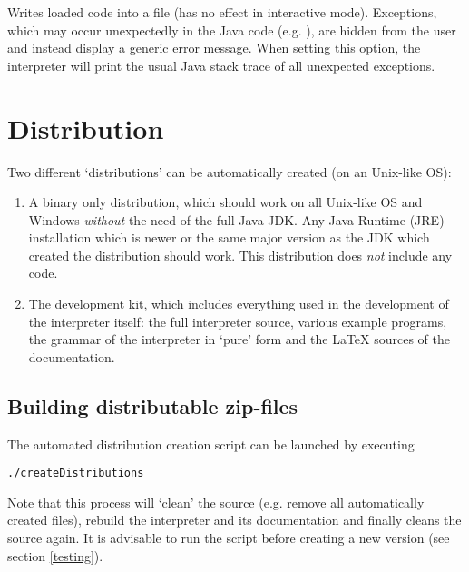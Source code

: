 \begin{itemize}
	      {Writes loaded code into a file (has no effect in interactive mode).}
	      {Exceptions, which may occur unexpectedly in the Java code (e.g. ), are hidden from the user and instead display a generic error message.
		When setting this option, the interpreter will print the usual Java stack trace of all unexpected exceptions.}
\end{itemize}

\section{Distribution}

Two different `distributions' can be automatically created (on an Unix-like OS):

\begin{enumerate}
	\item A binary only distribution, which should work on all Unix-like OS and Windows \emph{without} the need of the full Java JDK.
		Any Java Runtime (JRE) installation which is newer or the same major version as the JDK which created the distribution should work.
		This distribution does \emph{not} include any \SetlX{} code.

	\item The development kit, which includes everything used in the development of the interpreter itself: the full interpreter source, various \SetlX{} example programs, the grammar of the interpreter in `pure' form and the \LaTeX{} sources of the documentation.
\end{enumerate}

\subsection{Building distributable zip-files}

The automated distribution creation script can be launched by executing

\begin{lstlisting}[frame=none,numbers=none]
./createDistributions
\end{lstlisting}

Note that this process will `clean' the source (e.g. remove all automatically created files), rebuild the interpreter and its documentation and finally cleans the source again. It is advisable to run the  script before creating a new version (see section \ref{testing}).

